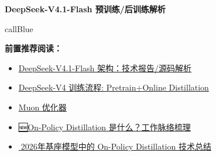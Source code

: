 \documentclass[zihao=false,fontset=windows]{ctexart}
\newcommand{\feiEmoji}[1]{{\emojifont #1}}
\begin{document}
{\bfseries DeepSeek-V4.1-Flash 预训练/后训练解析\par}

\begin{feishubox}{callBlue}{📌}

\textbf{前置推荐阅读：}\par
\begin{itemize}
\item 
\href{https://scnajei2ds6y.feishu.cn/wiki/StxKwYlBfi7D0DkwO0rcdjMInEZ}{DeepSeek-V4.1-Flash 架构：技术报告/源码解析}\par
\item 
\href{https://my.feishu.cn/wiki/C7KRwSCpZiE7olknCUPcKGY4n5c}{DeepSeek-V4 训练流程: Pretrain+Online Distillation}\par
\item 
\href{https://scnajei2ds6y.feishu.cn/wiki/Hcj2wGTJEiohTikkdEKc7H4Nnlb}{Muon 优化器}\par
\item 
\href{https://scnajei2ds6y.feishu.cn/wiki/J5iOw7jRxi3tjSkNDSMcTJwmn5d}{\feiEmoji{🆕}On-Policy Distillation 是什么？工作脉络梳理 }\par
\item 
\href{https://my.feishu.cn/wiki/TaPYw0sGViHBFNkXdFIceLTWnEg?from=space_search}{\feiEmoji{📗}2026年基座模型中的 On-Policy Distillation 技术总结}\par
\end{itemize}
\end{feishubox}
\end{document}
